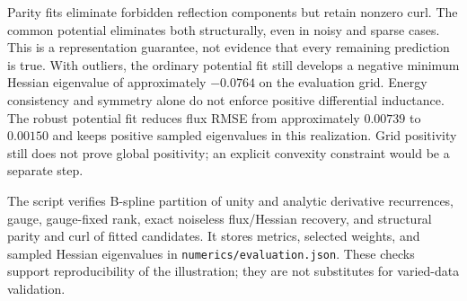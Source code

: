 Parity fits eliminate forbidden reflection components but retain nonzero
curl. The common potential eliminates both structurally, even in noisy and
sparse cases. This is a representation guarantee, not evidence that every
remaining prediction is true. With outliers, the ordinary potential fit
still develops a negative minimum Hessian eigenvalue of approximately
$-0.0764$ on the evaluation grid. Energy consistency and symmetry alone do
not enforce positive differential inductance. The robust potential fit
reduces flux RMSE from approximately $0.00739$ to $0.00150$ and keeps positive
sampled eigenvalues in this realization. Grid positivity still does not prove
global positivity; an explicit convexity constraint would be a separate step.

The script verifies B-spline partition of unity and analytic derivative
recurrences, gauge, gauge-fixed rank, exact noiseless flux/Hessian recovery,
and structural parity and curl of fitted candidates. It stores metrics,
selected weights, and sampled Hessian eigenvalues in
\texttt{numerics/evaluation.json}. These checks support reproducibility of
the illustration; they are not substitutes for varied-data validation.
